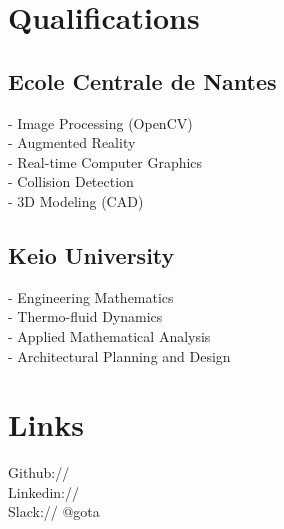 \documentclass[]{deedy-resume-openfont}
\begin{document}
\begin{minipage}[t]{0.33\textwidth} 


\section{Qualifications} 

\subsection{Ecole Centrale de Nantes}
     - Image Processing (OpenCV)\\
	 - Augmented Reality\\
	 - Real-time Computer Graphics\\
     - Collision Detection\\
	 - 3D Modeling (CAD)\\

\sectionsep

\subsection{Keio University}
- Engineering Mathematics\\
- Thermo-fluid Dynamics\\
- Applied Mathematical Analysis\\
- Architectural Planning and Design\\

\vspace{1.2cm}
\sectionsep


\section{Links} 
\faGithub Github:// \href{https://github.com/gshirato}{} \\
\faLinkedinSquare Linkedin:// \href{https://www.linkedin.com/in/gota-shirato}{} \\
\faSlack Slack:// @gota
\sectionsep
\vspace{7mm}

\end{minipage}
\end{document}

